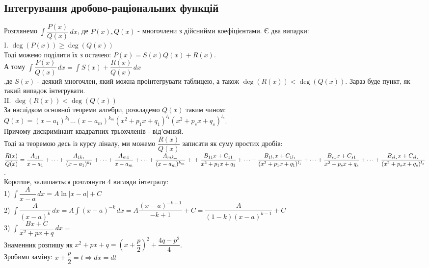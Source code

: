 \documentclass[a4paper, 10pt]{article}
\def\huge{\displaystyle}
\theoremstyle{theoremdd}
\theoremstyle{theoremdd}
\theoremstyle{theoremdd}
\theoremstyle{theoremdd}
\theoremstyle{theoremdd}
\theoremstyle{theoremdd}
\theoremstyle{theoremdd}
\theoremstyle{theoremdd}
\theoremstyle{theoremdd}
\begin{document}
\subsection{Інтегрування дробово-раціональних функцій}
Розглянемо $\huge \int \dfrac{P(x)}{Q(x)}\,dx$, де $P(x), Q(x)$ - многочлени з дійснийми коефіцієнтами. Є два випадки:\\
I. $\deg(P(x)) \geq \deg(Q(x))$\\
Тоді можемо поділити їх з остачею: $P(x) = S(x)Q(x) + R(x)$.\\
А тому $\huge \int \dfrac{P(x)}{Q(x)}\,dx = \int S(x) + \dfrac{R(x)}{Q(x)}\,dx$\\
,де $S(x)$ - деякий многочлен, який можна проінтегрувати таблицею, а також $\deg(R(x)) < \deg(Q(x))$. Зараз буде пункт, як такий випадок інтегрувати.
\bigskip \\
II. $\deg(R(x)) < \deg(Q(x))$\\
За наслідком основної теореми алгебри, розкладемо $Q(x)$ таким чином: \\
$Q(x) = (x-a_1)^{k_1} \dots (x-a_m)^{k_m} (x^2+p_1x+q_1)^{l_1} (x^2+p_sx+q_s)^{l_s}$. \\
Причому дискримінант квадратних трьохчленів - від'ємний. \\ 
Тоді за теоремою десь із курсу ліналу, ми можемо $\dfrac{R(x)}{Q(x)}$ записати як суму простих дробів:\\
$\dfrac{R(x)}{Q(x)} = \dfrac{A_{11}}{x-a_1} + \dots + \dfrac{A_{1k_1}}{(x-a_1)^{k_1}}+ \dots + \dfrac{A_{m1}}{x-a_m} + \dots + \dfrac{A_{mk_m}}{(x-a_m)^{k_m}} + \\
+ \dfrac{B_{11}x + C_{11}}{x^2+p_1x+q_1} + \dots + \dfrac{B_{1l_1}x + C_{1l_1}}{(x^2+p_1x+q_1)^{l_1}} + \dots + \dfrac{B_{s1}x + C_{s1}}{x^2+p_sx+q_s} + \dots + \dfrac{B_{sl_s}x + C_{sl_s}}{(x^2+p_sx+q_s)^{l_s}}$.\\
Коротше, залишається розглянути 4 вигляди інтегралу:
\bigskip \\
1) $\huge \int \dfrac{A}{x-a}\,dx = A\ln|x-a| + C$
\bigskip \\
2) $\huge \int \dfrac{A}{(x-a)^k}\,dx = A\int (x-a)^{-k}\,dx = A\dfrac{(x-a)^{-k+1}}{-k+1} + C = \dfrac{A}{(1-k)(x-a)^{k-1}} + C$
\bigskip \\
3) $\huge \int \dfrac{Bx+C}{x^2+px+q}\,dx \boxed{=}$\\
Знаменник розпишу як $x^2 + px + q = \left(x + \dfrac{p}{2} \right)^2 + \dfrac{4q-p^2}{4}$.\\
Зробимо заміну: $x + \dfrac{p}{2} = t \Rightarrow dx = dt$\\
\end{document}
